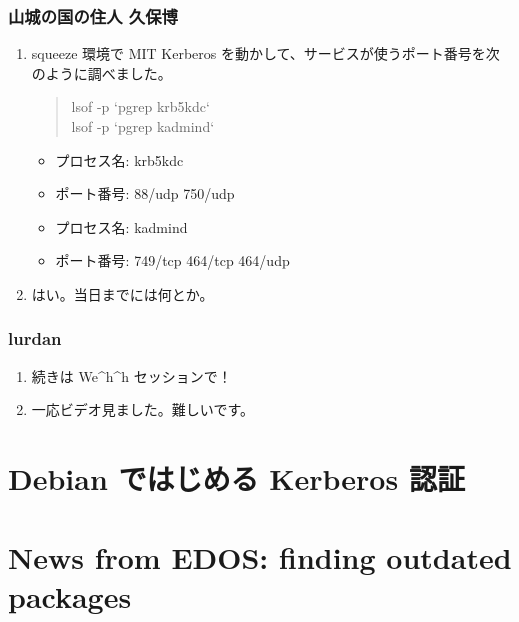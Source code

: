 \documentclass[cjk,dvipdfmx,10pt,%
hyperref={bookmarks=true,bookmarksnumbered=true,bookmarksopen=false,%
colorlinks=false,%
pdftitle={第 63 回 関西 Debian 勉強会},%
pdfauthor={倉敷・のがた・かわだ・佐々木},%
pdfsubject={資料},%
}]{beamer}
\begin{document}
\begin{frame}
  \frametitle{ 山城の国の住人 久保博 }
  \begin{enumerate}
  \item squeeze 環境で MIT Kerberos を動かして、サービスが使うポート番号を次のように調べました。
    \begin{quote}
lsof -p `pgrep krb5kdc`\\
lsof -p `pgrep kadmind`
    \end{quote}
    \begin{itemize}
    \item プロセス名: krb5kdc 
    \item ポート番号: 88/udp 750/udp
    \item プロセス名: kadmind
    \item ポート番号: 749/tcp 464/tcp 464/udp
    \end{itemize}
  \item はい。当日までには何とか。
  \end{enumerate}
\end{frame}

\begin{frame}
  \frametitle{ lurdan }
  \begin{enumerate}
  \item 続きは We\^{}h\^{}h セッションで！
  \item 一応ビデオ見ました。難しいです。
  \end{enumerate}
\end{frame}


\section{Debian ではじめる Kerberos 認証}


\section{News from EDOS: finding outdated packages}
\end{document}

